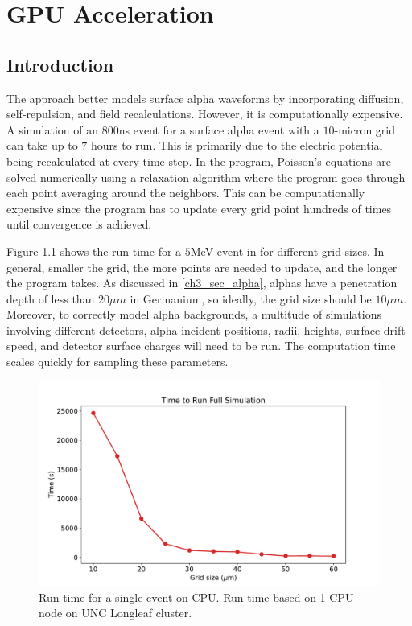 \chapter{GPU Acceleration}
\label{chap4:gpu}

\section{Introduction}
The {\ehd} approach better models surface alpha waveforms by incorporating diffusion, self-repulsion, and field recalculations. However, it is computationally expensive. A simulation of an $800$ns event for a surface alpha event with a $10$-micron grid can take up to $7$ hours to run. This is primarily due to the electric potential being recalculated at every time step. In the program, Poisson's equations are solved numerically using a relaxation algorithm where the program goes through each point averaging around the neighbors. This can be computationally expensive since the program has to update every grid point hundreds of times until convergence is achieved. 

Figure \ref{fig:CPU_time} shows the run time for a $5$MeV event in {\ehd} for different grid sizes. In general, smaller the grid, the more points are needed to update, and the longer the program takes. As discussed in \ref{ch3_sec_alpha}, alphas have a penetration depth of less than $20 \mu m$ in Germanium, so ideally, the grid size should be $10 \mu m$. Moreover, to correctly model alpha backgrounds, a multitude of simulations involving different detectors, alpha incident positions, radii, heights, surface drift speed, and detector surface charges will need to be run. The computation time scales quickly for sampling these parameters.

\begin{figure}
\centering
 \includegraphics[width=0.99\linewidth]{ch4/figs/cpu_run_time.pdf}
\caption{Run time for a single {\ehd} event on CPU. Run time based on 1 CPU node on UNC Longleaf cluster.}
\label{fig:CPU_time}
\end{figure}

